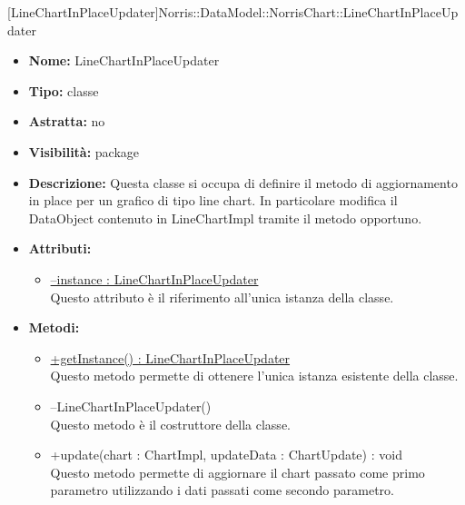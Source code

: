 			
			[LineChartInPlaceUpdater]{Norris::DataModel::NorrisChart::LineChartInPlaceUpdater}
			

	
			
			\begin{itemize}
			\item \textbf{Nome:} LineChartInPlaceUpdater
			\item \textbf{Tipo:} classe
			
		\item \textbf{Astratta:}
		no
			\item \textbf{Visibilità:} package
			\item \textbf{Descrizione:} Questa classe si occupa di definire il metodo di aggiornamento in place per un grafico di tipo line chart. In particolare modifica il DataObject contenuto in LineChartImpl tramite il metodo opportuno.
			\item \textbf{Attributi:}
				\begin{itemize}
				\setlength{\itemsep}{5pt}
				
					\item[\ding{111}] \underline{--instance : LineChartInPlaceUpdater} \\ [1mm] Questo attributo è il riferimento all'unica istanza della classe.
				\end{itemize}
		
			\item \textbf{Metodi:}
				\begin{itemize}
				\setlength{\itemsep}{5pt}
				
					\item[\ding{111}] {\underline{+getInstance() : LineChartInPlaceUpdater}} \\ [1mm] Questo metodo permette di ottenere l'unica istanza esistente della classe.
					\item[\ding{111}] {{--LineChartInPlaceUpdater()}} \\ [1mm] Questo metodo è il costruttore della classe.
					\item[\ding{111}] {{+update(chart : ChartImpl, updateData : ChartUpdate) : void}} \\ [1mm] Questo metodo permette di aggiornare il chart passato come primo parametro utilizzando i dati passati come secondo parametro.
				\end{itemize}
		
			\end{itemize}


